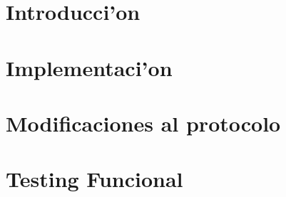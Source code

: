 \documentclass[spanish, a4paper, 10pt, titlepage]{article}
\author{Echevarr'ia - Farjat - Freijo - Giusto}
\begin{document}

\tableofcontents
\clearpage



\section{Introducci'on}

\clearpage

\section{Implementaci'on}

\clearpage

\section{Modificaciones al protocolo}

\clearpage


\section{Testing Funcional}

\clearpage

%
\end{document}

